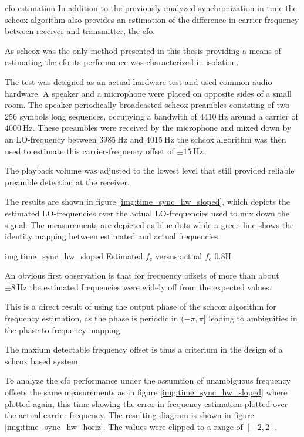 \begin{subchapter}{\Acrlong{cfo} estimation}
  In addition to the previously analyzed synchronization in time
  the \gls{schcox} algorithm also provides an estimation of
  the difference in carrier frequency between receiver and
  transmitter, the \acrfull{cfo}.

  As \gls{schcox} was the only method presented in this thesis
  providing a means of estimating the \gls{cfo}
  its performance was characterized in isolation.

  The test was designed as an actual-hardware test
  and used common audio hardware.
  A speaker and a microphone were placed on opposite
  sides of a small room. The speaker periodically broadcasted
  \gls{schcox} preambles consisting of two 256 symbols long
  sequences, occupying a bandwith of $\SI{4410}{\hertz}$
  around a carrier of $\SI{4000}{\hertz}$.
  These preambles were received by the microphone and mixed
  down by an LO-frequency between $\SI{3985}{\hertz}$ and $\SI{4015}{\hertz}$
  the \gls{schcox} algorithm was then used to estimate
  this carrier-frequency offset of $\pm\SI{15}{\hertz}$.

  The playback volume was adjusted to the lowest level
  that still provided reliable preamble detection at the receiver.

  The results are shown in figure \ref{img:time_sync_hw_sloped},
  which depicts the estimated LO-frequencies over the
  actual LO-frequencies used to mix down the signal.
  The measurements are depicted as blue dots while a
  green line shows the identity mapping between estimated
  and actual frequencies.

                  {img:time_sync_hw_sloped}
                  {Estimated $f_\text{c}$ versus actual $f_\text{c}$}
                  {0.8}{H}

  An obvious first observation is that for frequency offsets of
  more than about $\pm\SI{8}{\hertz}$ the estimated frequencies
  were widely off from the expected values.

  This is a direct result of using the output phase
  of the \gls{schcox} algorithm for frequency estimation,
  as the phase is periodic in $(-\pi, \pi]$ leading to
  ambiguities in the phase-to-frequency mapping.

  The maxium detectable frequency offset is thus
  a criterium in the design of a \gls{schcox}
  based system.

  To analyze the \gls{cfo} performance under the assumtion
  of unambiguous frequency offsets the same measurements
  as in figure \ref{img:time_sync_hw_sloped} where plotted
  again, this time showing the error in frequency estimation
  plotted over the actual carrier frequency.
  The resulting diagram is shown in
  figure \ref{img:time_sync_hw_horiz}.
  The values were clipped to a range of $[-2, 2]$.


\end{subchapter}
